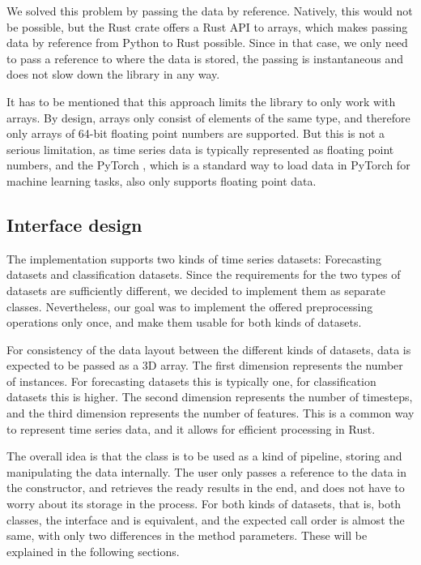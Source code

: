 \documentclass[review]{AIM_report}
\begin{document}
We solved this problem by passing the data by reference. Natively, this would not be possible, but the Rust crate \numpy offers a Rust API to \numpy arrays, which makes passing data by reference from Python to Rust possible. Since in that case, we only need to pass a reference to where the data is stored, the passing is instantaneous and does not slow down the library in any way.

It has to be mentioned that this approach limits the library to only work with \numpy arrays. By design, \numpy arrays only consist of elements of the same type, and therefore only arrays of 64-bit floating point numbers are supported. But this is not a serious limitation, as time series data is typically represented as floating point numbers, and the PyTorch \dataLoader, which is a standard way to load data in PyTorch for machine learning tasks, also only supports floating point data.

\subsection{Interface design}

The implementation supports two kinds of time series datasets: Forecasting datasets and classification datasets. Since the requirements for the two types of datasets are sufficiently different, we decided to implement them as separate classes. Nevertheless, our goal was to implement the offered preprocessing operations only once, and make them usable for both kinds of datasets.

For consistency of the data layout between the different kinds of datasets, data is expected to be passed as a 3D \numpy array. The first dimension represents the number of instances.  For forecasting datasets this is typically one, for classification datasets this is higher. The second dimension represents the number of timesteps, and the third dimension represents the number of features. This is a common way to represent time series data, and it allows for efficient processing in Rust.

The overall idea is that the class is to be used as a kind of pipeline, storing and manipulating the data internally. The user only passes a reference to the data in the constructor, and retrieves the ready results in the end, and does not have to worry about its storage in the process. For both kinds of datasets, that is, both classes, the interface and is equivalent, and the expected call order is almost the same, with only two differences in the method parameters. These will be explained in the following sections.
\end{document}
